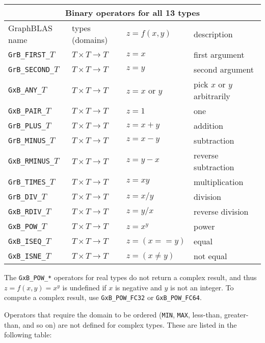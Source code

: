 \documentclass[12pt]{article}
\begin{document}
\vspace{0.2in}
{\footnotesize
\begin{tabular}{|llll|}
\hline
\multicolumn{4}{|c|}{Binary operators for all 13 types} \\
\hline
GraphBLAS name        & types (domains)            & $z=f(x,y)$      & description \\
\hline
\verb'GrB_FIRST_'$T$  & $T \times T \rightarrow T$ & $z = x$         & first argument \\
\verb'GrB_SECOND_'$T$ & $T \times T \rightarrow T$ & $z = y$         & second argument \\
\verb'GxB_ANY_'$T$    & $T \times T \rightarrow T$ & $z = x$ or $y$  & pick $x$ or $y$ arbitrarily \\
\verb'GxB_PAIR_'$T$   & $T \times T \rightarrow T$ & $z = 1$         & one \\
\verb'GrB_PLUS_'$T$   & $T \times T \rightarrow T$ & $z = x+y$       & addition \\
\verb'GrB_MINUS_'$T$  & $T \times T \rightarrow T$ & $z = x-y$       & subtraction \\
\verb'GxB_RMINUS_'$T$ & $T \times T \rightarrow T$ & $z = y-x$       & reverse subtraction \\
\verb'GrB_TIMES_'$T$  & $T \times T \rightarrow T$ & $z = xy$        & multiplication \\
\verb'GrB_DIV_'$T$    & $T \times T \rightarrow T$ & $z = x/y$       & division \\
\verb'GxB_RDIV_'$T$   & $T \times T \rightarrow T$ & $z = y/x$       & reverse division \\
\verb'GxB_POW_'$T$    & $T \times T \rightarrow T$ & $z = x^y$       & power \\
\hline
\verb'GxB_ISEQ_'$T$   & $T \times T \rightarrow T$ & $z = (x == y)$  & equal \\
\verb'GxB_ISNE_'$T$   & $T \times T \rightarrow T$ & $z = (x \ne y)$ & not equal \\
\hline
\end{tabular}
}
\vspace{0.2in}

The \verb'GxB_POW_*' operators for real types do not return a complex result,
and thus $z = f(x,y) = x^y$ is undefined if $x$ is negative and $y$ is not an
integer.  To compute a complex result, use \verb'GxB_POW_FC32' or
\verb'GxB_POW_FC64'.

Operators that require the domain to be ordered (\verb'MIN', \verb'MAX',
less-than, greater-than, and so on) are not defined for
complex types.  These are listed in the following table:
\end{document}
